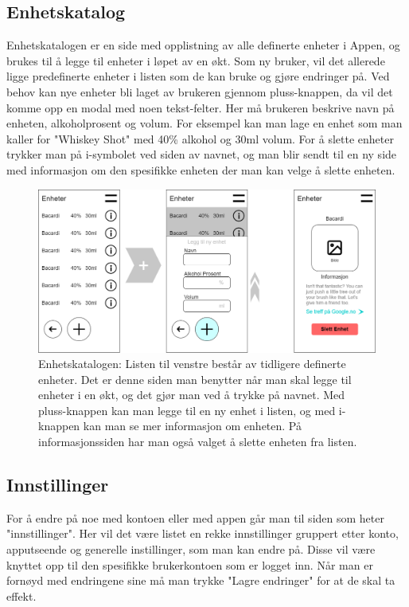 \documentclass[12pt]{article}
\begin{document}
\subsection{Enhetskatalog}
Enhetskatalogen er en side med opplistning av alle definerte enheter i Appen, og brukes til å legge til enheter i løpet av en økt. Som ny bruker, vil det allerede ligge predefinerte enheter i listen som de kan bruke og gjøre endringer på. Ved behov kan nye enheter bli laget av brukeren gjennom pluss-knappen, da vil det komme opp en modal med noen tekst-felter. Her må brukeren beskrive navn på enheten, alkoholprosent og volum. For eksempel kan man lage en enhet som man kaller for "Whiskey Shot" med 40\% alkohol og 30ml volum. For å slette enheter trykker man på i-symbolet ved siden av navnet, og man blir sendt til en ny side med informasjon om den spesifikke enheten der man kan velge å slette enheten.

\begin{figure}[H]
    \centering
    \includegraphics[scale=0.4]{images/lille_promille_unitcatalog.drawio.png}
    \caption{Enhetskatalogen: Listen til venstre består av tidligere definerte enheter. Det er denne siden man benytter når man skal legge til enheter i en økt, og det gjør man ved å trykke på navnet. Med pluss-knappen kan man legge til en ny enhet i listen, og med i-knappen kan man se mer informasjon om enheten. På informasjonssiden har man også valget å slette enheten fra listen.}
\end{figure}

\subsection{Innstillinger}
For å endre på noe med kontoen eller med appen går man til siden som heter "innstillinger". Her vil det være listet en rekke innstillinger gruppert etter konto, apputseende og generelle instillinger, som man kan endre på. Disse vil være knyttet opp til den spesifikke brukerkontoen som er logget inn. Når man er fornøyd med endringene sine må man trykke "Lagre endringer" for at de skal ta effekt.
\end{document}
